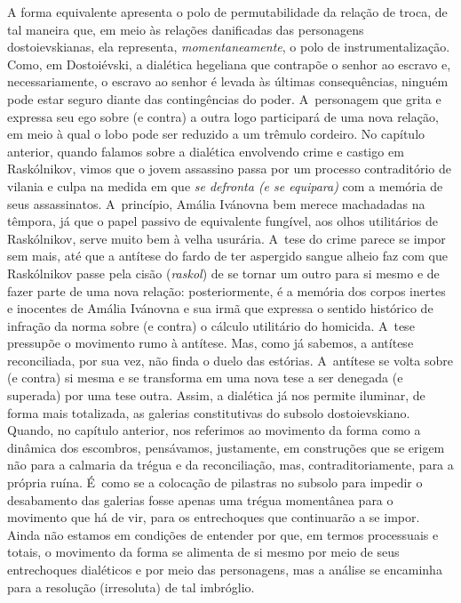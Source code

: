 {A forma equivalente apresenta o polo de permutabilidade da relação de
troca, de tal maneira que, em meio às relações danificadas das
personagens dostoievskianas, ela representa, \emph{momentaneamente}, o
polo de instrumentalização. Como, em Dostoiévski, a dialética hegeliana
que contrapõe o senhor ao escravo e, necessariamente, o escravo ao
senhor é levada às últimas consequências, ninguém pode estar seguro
diante das contingências do poder. A~personagem que grita e expressa seu
ego sobre (e contra) a outra logo participará de uma nova relação, em
meio à qual o lobo pode ser reduzido a um trêmulo cordeiro. No capítulo
anterior, quando falamos sobre a dialética envolvendo crime e castigo em
Raskólnikov, vimos que o jovem assassino passa por um processo
contraditório de vilania e culpa na medida em que \emph{se defronta (e
se equipara)} com a memória de seus assassinatos. A~princípio, Amália
Ivánovna bem merece machadadas na têmpora, já que o papel passivo de
equivalente fungível, aos olhos utilitários de Raskólnikov, serve muito
bem à velha usurária. A~tese do crime parece se impor sem mais, até que
a antítese do fardo de ter aspergido sangue alheio faz com que
Raskólnikov passe pela cisão (\emph{raskol}) de se tornar um outro para
si mesmo e de fazer parte de uma nova relação: posteriormente, é a
memória dos corpos inertes e inocentes de Amália Ivánovna e sua irmã que
expressa o sentido histórico de infração da norma sobre (e contra) o
cálculo utilitário do homicida. A~tese pressupõe o movimento rumo à
antítese. Mas, como já sabemos, a antítese reconciliada, por sua vez,
não finda o duelo das estórias. A~antítese se volta sobre (e contra) si
mesma e se transforma em uma nova tese a ser denegada (e superada) por
uma tese outra. Assim, a dialética já nos permite iluminar, de forma
mais totalizada, as galerias constitutivas do subsolo dostoievskiano.
Quando, no capítulo anterior, nos referimos ao movimento da forma como a
dinâmica dos escombros, pensávamos, justamente, em construções que se
erigem não para a calmaria da trégua e da reconciliação, mas,
contraditoriamente, para a própria ruína. É~como se a colocação de
pilastras no subsolo para impedir o desabamento das galerias fosse
apenas uma trégua momentânea para o movimento que há de vir, para os
entrechoques que continuarão a se impor. Ainda não estamos em condições
de entender por que, em termos processuais e totais, o movimento da
forma se alimenta de si mesmo por meio de seus entrechoques dialéticos e
por meio das personagens, mas a análise se encaminha para a resolução
(irresoluta) de tal imbróglio.

}
